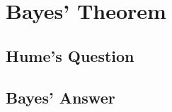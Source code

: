 \chapter{Bayes' Theorem}
\label{ch:bayes}
\setlength{\parindent}{1em}

\section{Hume's Question}


\section{Bayes' Answer}
